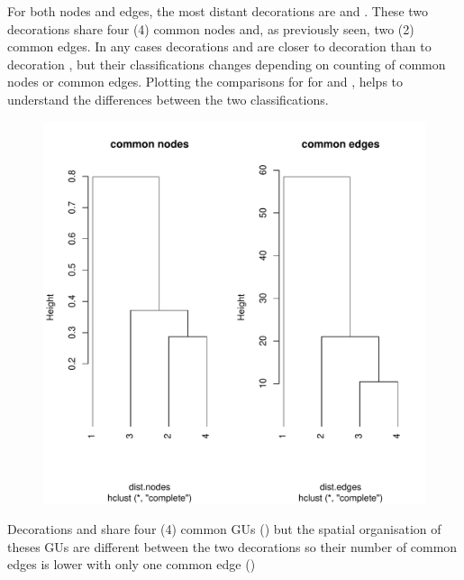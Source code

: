 \documentclass[article]{jss}\usepackage[]{graphicx}\usepackage[]{color}
\makeatletter
\def\maxwidth{ %
  \ifdim\Gin@nat@width>\linewidth
    \linewidth
  \else
    \Gin@nat@width
  \fi
}
\newenvironment{knitrout}{}{} %
\makeatother
\begin{document}
For both nodes and edges, the most distant decorations are  and . These two decorations share four (4) common nodes and, as previously seen, two (2) common edges.
In any cases decorations  and  are closer to decoration  than to decoration , but their classifications changes depending on counting of common nodes or common edges. Plotting the comparisons for for  and , helps to understand the differences between the two classifications.

\begin{figure}[H]
\begin{knitrout}
\color{fgcolor}
\includegraphics[width=\maxwidth]{figure/unnamed-chunk-16-1} 

\end{knitrout}
\end{figure}


Decorations  and  share four (4) common GUs () but the spatial organisation of theses GUs are different between the two decorations so their number of common edges is lower with only one common edge ()



\end{document}
